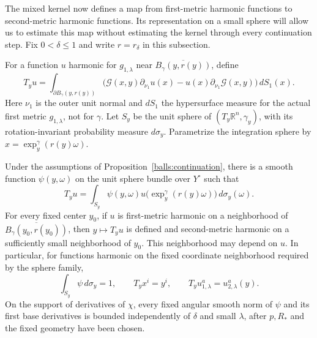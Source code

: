 The mixed kernel now defines a map from first-metric harmonic functions
to second-metric harmonic functions.  Its representation on a small
sphere will allow us to estimate this map without estimating the kernel
through every continuation step.
Fix $0<\delta\le1$ and write $r=r_\delta$ in this subsection.

For a function $u$ harmonic for $g_{1,\lambda}$ near
$\overline{B_\gamma(y,r(y))}$, define
\begin{equation}\label{balls:flux}
 T_yu=\int_{\partial B_\gamma(y,r(y))}
  \bigl(\mathcal G(x,y)\partial_{\nu_1}u(x)
       -u(x)\partial_{\nu_1}\mathcal G(x,y)\bigr)\,dS_1(x).
\end{equation}
Here $\nu_1$ is the outer unit normal and $dS_1$ the hypersurface measure
for the actual first metric $g_{1,\lambda}$, not for $\gamma$.
Let $S_y$ be the unit sphere of $(T_y\mathbb R^n,\gamma_y)$, with its
rotation-invariant probability measure $d\sigma_y$.  Parametrize the
integration sphere by $x=\exp_y^\gamma(r(y)\omega)$.

\begin{proposition}\label{balls:functional}
Under the assumptions of Proposition~\ref{balls:continuation}, there is
a smooth function $\psi(y,\omega)$ on the unit sphere bundle over
$Y^\circ$ such that
\begin{equation}\label{balls:density-representation}
 T_yu=\int_{S_y}\psi(y,\omega)
              u\bigl(\exp_y^\gamma(r(y)\omega)\bigr)\,d\sigma_y(\omega).
\end{equation}
For every fixed center $y_0$, if $u$ is first-metric harmonic on a
neighborhood of $\overline{B_\gamma(y_0,r(y_0))}$, then
$y\mapsto T_yu$ is defined and second-metric harmonic on a sufficiently
small neighborhood of $y_0$.  This neighborhood may depend on $u$.
In particular, for functions harmonic on the fixed coordinate
neighborhood required by the sphere family,
\begin{equation}\label{balls:reproduction}
 \int_{S_y}\psi\,d\sigma_y=1,
 \qquad T_yx^i=y^i,
 \qquad T_yu_{1,\lambda}^a=u_{2,\lambda}^a(y).
\end{equation}
On the support of derivatives of $\chi$, every fixed angular smooth
norm of $\psi$ and its first base derivatives is bounded independently
of $\delta$ and small $\lambda$, after $p,R_*$ and the fixed geometry
have been chosen.
\end{proposition}

